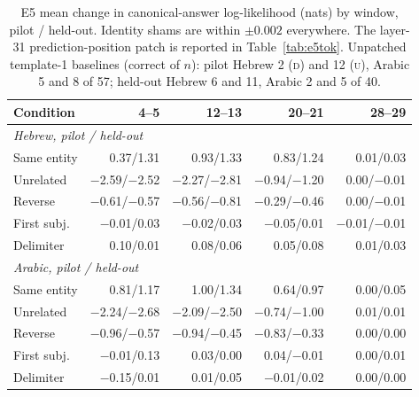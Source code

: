 \documentclass[11pt]{article}
\newcommand{\U}{\textsc{u}}
\newcommand{\D}{\textsc{d}}
\begin{document}
\begin{table}[t]
\centering\small
\setlength{\tabcolsep}{9pt}
\begin{tabular}{@{}lrrrr@{}}
\toprule
Condition & 4--5 & 12--13 & 20--21 & 28--29\\
\midrule
\multicolumn{5}{l}{\emph{Hebrew, pilot / held-out}}\\
Same entity & 0.37/1.31 & 0.93/1.33 & 0.83/1.24 & 0.01/0.03\\
Unrelated & $-$2.59/$-$2.52 & $-$2.27/$-$2.81 & $-$0.94/$-$1.20 & 0.00/$-$0.01\\
Reverse & $-$0.61/$-$0.57 & $-$0.56/$-$0.81 & $-$0.29/$-$0.46 & 0.00/$-$0.01\\
First subj. & $-$0.01/0.03 & $-$0.02/0.03 & $-$0.05/0.01 & $-$0.01/$-$0.01\\
Delimiter & 0.10/0.01 & 0.08/0.06 & 0.05/0.08 & 0.01/0.03\\

\midrule
\multicolumn{5}{l}{\emph{Arabic, pilot / held-out}}\\
Same entity & 0.81/1.17 & 1.00/1.34 & 0.64/0.97 & 0.00/0.05\\
Unrelated & $-$2.24/$-$2.68 & $-$2.09/$-$2.50 & $-$0.74/$-$1.00 & 0.01/0.01\\
Reverse & $-$0.96/$-$0.57 & $-$0.94/$-$0.45 & $-$0.83/$-$0.33 & 0.00/0.00\\
First subj. & $-$0.01/0.13 & 0.03/0.00 & 0.04/$-$0.01 & 0.00/0.01\\
Delimiter & $-$0.15/0.01 & 0.01/0.05 & $-$0.01/0.02 & 0.00/0.00\\

\bottomrule
\end{tabular}
\caption{E5 mean change in canonical-answer log-likelihood (nats) by window,
pilot / held-out. Identity shams are within $\pm0.002$ everywhere. The layer-31 prediction-position patch is reported in Table~\ref{tab:e5tok}. Unpatched
template-1 baselines (correct of $n$): pilot Hebrew 2 (\D) and 12 (\U), Arabic 5
and 8 of 57; held-out Hebrew 6 and 11, Arabic 2 and 5 of 40.}
\label{tab:e5}
\end{table}
\end{document}
